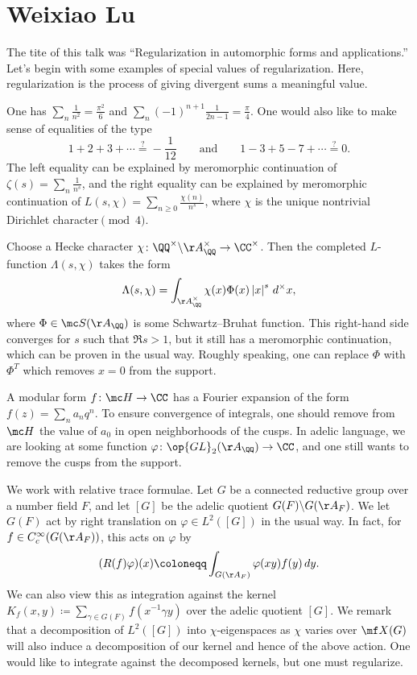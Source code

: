 \documentclass{article}
\begin{document}
\section{Weixiao Lu}
The tite of this talk was ``Regularization in automorphic forms and applications.'' Let's begin with some examples of special values of regularization. Here, regularization is the process of giving divergent sums a meaningful value.
\begin{example}
	One has $\sum_n\frac1{n^2}=\frac{\pi^2}6$ and $\sum_n(-1)^{n+1}\frac1{2n-1}=\frac\pi4$. One would also like to make sense of equalities of the type
	\[1+2+3+\cdots\stackrel?=-\frac1{12}\qquad\text{and}\qquad1-3+5-7+\cdots\stackrel?=0.\]
	The left equality can be explained by meromorphic continuation of $\zeta(s)=\sum_n\frac1{n^s}$, and the right equality can be explained by meromorphic continuation of $L(s,\chi)=\sum_{n\ge0}\frac{\chi(n)}{n^s}$, where $\chi$ is the unique nontrivial Dirichlet character$\pmod4$.
\end{example}
\begin{example}
	Choose a Hecke character $\chi\colon\QQ^\times\backslash\AA_\QQ^\times\to\CC^\times$. Then the completed $L$-function $\Lambda(s,\chi)$ takes the form
	\[\Lambda(s,\chi)=\int_{\AA_\QQ^\times}\chi(x)\Phi(x)\left|x\right|^s\,d^\times x,\]
	where $\Phi\in\mc S(\AA_\QQ)$ is some Schwartz--Bruhat function. This right-hand side converges for $s$ such that $\Re s>1$, but it still has a meromorphic continuation, which can be proven in the usual way. Roughly speaking, one can replace $\Phi$ with $\Phi^T$ which removes $x=0$ from the support.
\end{example}
\begin{example}
	A modular form $f\colon\mc H\to\CC$ has a Fourier expansion of the form $f(z)=\sum_na_nq^n$. To ensure convergence of integrals, one should remove from $\mc H$ the value of $a_0$ in open neighborhoods of the cusps. In adelic language, we are looking at some function $\varphi\colon\op{GL}_2(\AA_\QQ)\to\CC$, and one still wants to remove the cusps from the support.
\end{example}
\begin{example}
	We work with relative trace formulae. Let $G$ be a connected reductive group over a number field $F$, and let $[G]$ be the adelic quotient $G(F)\backslash G(\AA_F)$. We let $G(F)$ act by right translation on $\varphi\in L^2([G])$ in the usual way. In fact, for $f\in C_c^\infty(G(\AA_F))$, this acts on $\varphi$ by
	\[(R(f)\varphi)(x)\coloneqq\int_{G(\AA_F)}\varphi(xy)f(y)\,dy.\]
	We can also view this as integration against the kernel $K_f(x,y)\coloneqq\sum_{\gamma\in G(F)}f\left(x^{-1}\gamma y\right)$ over the adelic quotient $[G]$. We remark that a decomposition of $L^2([G])$ into $\chi$-eigenspaces as $\chi$ varies over $\mf X(G)$ will also induce a decomposition of our kernel and hence of the above action. One would like to integrate against the decomposed kernels, but one must regularize.
\end{example}
\end{document}
